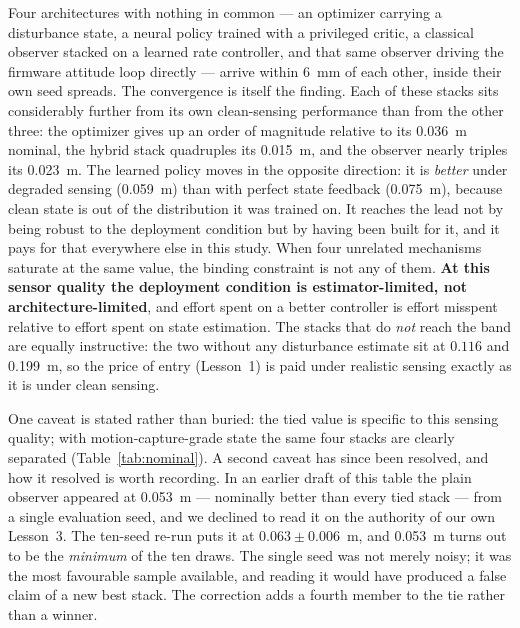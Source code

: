 \noindent Four architectures with nothing in common --- an optimizer carrying a
disturbance state, a neural policy trained with a privileged critic, a classical observer
stacked on a learned rate controller, and that same observer driving the firmware
attitude loop directly --- arrive within \SI{6}{\milli\meter} of each other, inside their
own seed spreads. The convergence is itself the finding. Each of these stacks sits
considerably further from its own clean-sensing performance than from the other three:
the optimizer gives up an order of magnitude relative to its \SI{0.036}{\meter} nominal,
the hybrid stack quadruples its \SI{0.015}{\meter}, and the observer nearly triples its
\SI{0.023}{\meter}. The learned policy moves in the opposite direction: it is
\emph{better} under degraded sensing (\SI{0.059}{\meter}) than with perfect state
feedback (\SI{0.075}{\meter}), because clean state is out of the distribution it was
trained on. It reaches the lead not by being robust to the deployment condition but by
having been built for it, and it pays for that everywhere else in this study. When four unrelated mechanisms saturate at the same value, the binding constraint
is not any of them. \textbf{At this sensor quality the deployment condition is
estimator-limited, not architecture-limited}, and effort spent on a better controller is
effort misspent relative to effort spent on state estimation. The stacks that do
\emph{not} reach the band are equally instructive: the two without any disturbance
estimate sit at $0.116$ and \SI{0.199}{\meter}, so the price of entry (Lesson~1) is paid
under realistic sensing exactly as it is under clean sensing.

One caveat is stated rather than buried: the tied value is specific to this sensing
quality; with motion-capture-grade state the same four stacks are clearly separated
(Table~\ref{tab:nominal}). A second caveat has since been resolved, and how it resolved
is worth recording. In an earlier draft of this table the plain observer appeared at
\SI{0.053}{\meter} --- nominally better than every tied stack --- from a single
evaluation seed, and we declined to read it on the authority of our own Lesson~3. The
ten-seed re-run puts it at $0.063\pm0.006$~\si{\meter}, and \SI{0.053}{\meter} turns out
to be the \emph{minimum} of the ten draws. The single seed was not merely noisy; it was
the most favourable sample available, and reading it would have produced a false claim of
a new best stack. The correction adds a fourth member to the tie rather than a winner.

